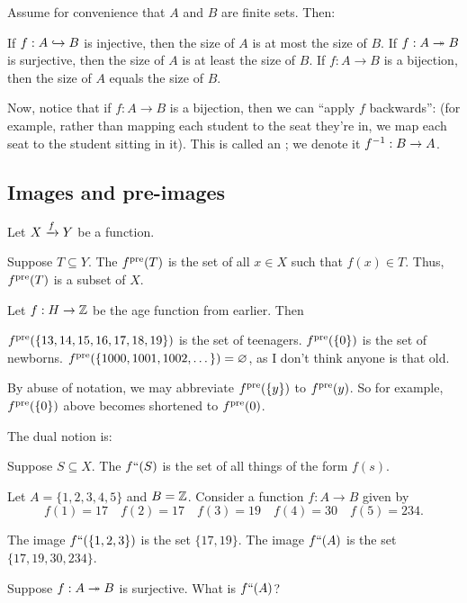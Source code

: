 \begin{remark}
	Assume for convenience that $A$ and $B$ are finite sets. Then:
	\begin{itemize}
		\ii If $f : A \hookrightarrow B$ is injective, then the size of $A$ is at most the size of $B$.
		\ii If $f : A \twoheadrightarrow B$ is surjective, then the size of $A$ is at least the size of $B$.
		\ii If $f : A \to B$ is a bijection, then the size of $A$ equals the size of $B$.
	\end{itemize}
\end{remark}

Now, notice that if $f : A \to B$ is a bijection,
then we can ``apply $f$ backwards'':
(for example, rather than mapping each student to the seat they're in,
we map each seat to the student sitting in it).
This is called an ; we denote it $f^{-1} : B \to A$.

\subsection{Images and pre-images}
Let $X \xrightarrow{f} Y$ be a function.

\begin{definition}
	Suppose $T \subseteq Y$.
	The  $f^{\text{pre}}(T)$ is the set of all
	$x \in X$ such that $f(x) \in T$.
	Thus, $f^{\text{pre}}(T)$ is a subset of $X$.
\end{definition}
\begin{example}
	Let $f : H \to \mathbb Z$ be the age function from earlier.
	Then
	\begin{enumerate}[(a)]
		\ii $f^{\text{pre}}(\{13, 14, 15, 16, 17, 18, 19\})$ is the set of teenagers.
		\ii $f^{\text{pre}}(\{0\})$ is the set of newborns.
		\ii $f^{\text{pre}}(\{1000, 1001, 1002, \dots \}) = \varnothing$,
		as I don't think anyone is that old.
	\end{enumerate}
\end{example}

\begin{abuse}
	By abuse of notation, we may abbreviate $f^{\text{pre}}(\{y\})$ to $f^{\text{pre}}(y)$.
	So for example, $f^{\text{pre}}(\{0\})$ above becomes shortened to $f^{\text{pre}}(0)$.
\end{abuse}

The dual notion is:
\begin{definition}
	Suppose $S \subseteq X$.
	The  $f``(S)$ is the set of all things of the form $f(s)$.
\end{definition}
\begin{example}
	Let $A = \{1,2,3,4,5\}$ and $B = \mathbb Z$.
	Consider a function $f : A \to B$ given by
	\[
		f(1) = 17 \quad
		f(2) = 17 \quad
		f(3) = 19 \quad
		f(4) = 30 \quad
		f(5) = 234.
	\]
	\begin{enumerate}[(a)]
		\ii The image $f``(\{1,2,3\})$ is the set $\{17, 19\}$.
		\ii The image $f``(A)$ is the set $\{17, 19, 30, 234\}$.
	\end{enumerate}
\end{example}
\begin{ques}
	Suppose $f : A \twoheadrightarrow B$ is surjective.
	What is $f``(A)$?
\end{ques}

